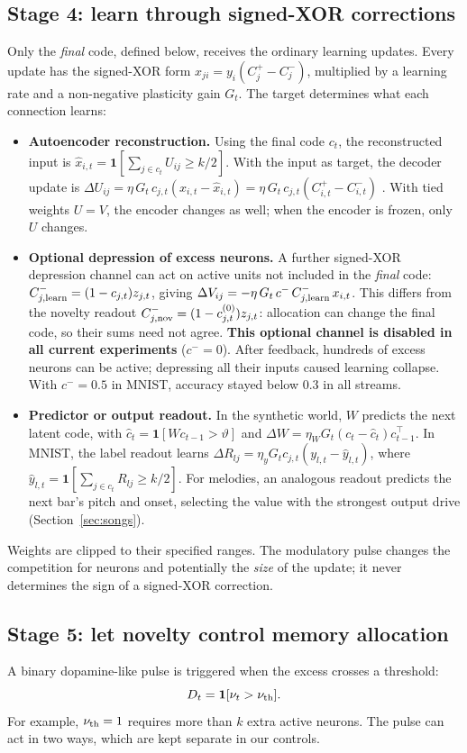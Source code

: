 \documentclass[11pt,a4paper]{article}
\begin{document}
\subsection{Stage 4: learn through signed-XOR corrections}\label{sec:learning}
Only the \emph{final} code, defined below, receives the ordinary learning updates. Every update has the signed-XOR form $x_{ji}=y_i(C^+_j-C^-_j)$, multiplied by a learning rate and a non-negative plasticity gain $G_t$. The target determines what each connection learns:
\begin{itemize}
\item \textbf{Autoencoder reconstruction.} Using the final code $c_t$, the reconstructed input is $\hat x_{i,t}=\mathbf 1[\sum_{j\in c_t}U_{ij}\ge k/2]$. With the input as target, the decoder update is $\Delta U_{ij}=\eta\,G_t\,c_{j,t}(x_{i,t}-\hat x_{i,t})=\eta\,G_t\,c_{j,t}(C^+_{i,t}-C^-_{i,t})$ \citep{pena2026loss}. With tied weights $U=V$, the encoder changes as well; when the encoder is frozen, only $U$ changes.
\item \textbf{Optional depression of excess neurons.} A further signed-XOR depression channel can act on active units not included in the \emph{final} code: $C^-_{j,\rm learn}=(1-c_{j,t})z_{j,t}$, giving $\Delta V_{ij}=-\eta\,G_t\,c^-\,C^-_{j,\rm learn}\,x_{i,t}$. This differs from the novelty readout $C^-_{j,\rm nov}=(1-c^{(0)}_{j,t})z_{j,t}$: allocation can change the final code, so their sums need not agree. \textbf{This optional channel is disabled in all current experiments} ($c^-=0$). After feedback, hundreds of excess neurons can be active; depressing all their inputs caused learning collapse. With $c^-=0.5$ in MNIST, accuracy stayed below 0.3 in all streams.
\item \textbf{Predictor or output readout.} In the synthetic world, $W$ predicts the next latent code, with $\hat c_t=\mathbf 1[Wc_{t-1}>\vartheta]$ and $\Delta W=\eta_W G_t(c_t-\hat c_t)c_{t-1}^{\top}$. In MNIST, the label readout learns $\Delta R_{lj}=\eta_y G_t c_{j,t}(y_{l,t}-\hat y_{l,t})$, where $\hat y_{l,t}=\mathbf 1[\sum_{j\in c_t}R_{lj}\ge k/2]$. For melodies, an analogous readout predicts the next bar's pitch and onset, selecting the value with the strongest output drive (Section~\ref{sec:songs}).
\end{itemize}
Weights are clipped to their specified ranges. The modulatory pulse changes the competition for neurons and potentially the \emph{size} of the update; it never determines the sign of a signed-XOR correction.

\subsection{Stage 5: let novelty control memory allocation}\label{sec:dopamine}
A binary dopamine-like pulse is triggered when the excess crosses a threshold:
\[
D_t=\mathbf 1[\nu_t>\nu_{\rm th}].
\]
For example, $\nu_{\rm th}=1$ requires more than $k$ extra active neurons. The pulse can act in two ways, which are kept separate in our controls.
\end{document}
